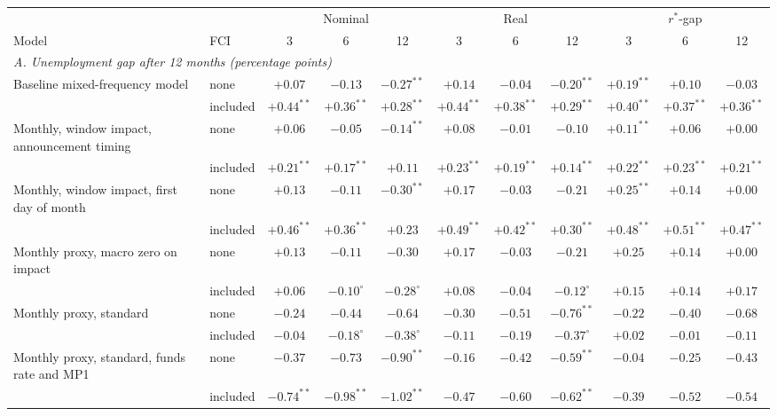 \begin{tabular}{llccccccccc}\toprule
 & & \multicolumn{3}{c}{Nominal} & \multicolumn{3}{c}{Real} & \multicolumn{3}{c}{$r^*$-gap}\\
\cmidrule(lr){3-5}\cmidrule(lr){6-8}\cmidrule(lr){9-11}
Model & FCI & 3 & 6 & 12 & 3 & 6 & 12 & 3 & 6 & 12\\
\midrule
\multicolumn{11}{l}{\textit{A. Unemployment gap after 12 months (percentage points)}}\\
Baseline mixed-frequency model & none & $+0.07$ & $-0.13$ & $-0.27^{**}$ & $+0.14$ & $-0.04$ & $-0.20^{**}$ & $+0.19^{**}$ & $+0.10$ & $-0.03$\\
 & included & $+0.44^{**}$ & $+0.36^{**}$ & $+0.28^{**}$ & $+0.44^{**}$ & $+0.38^{**}$ & $+0.29^{**}$ & $+0.40^{**}$ & $+0.37^{**}$ & $+0.36^{**}$\\
Monthly, window impact, announcement timing & none & $+0.06$ & $-0.05$ & $-0.14^{**}$ & $+0.08$ & $-0.01$ & $-0.10$ & $+0.11^{**}$ & $+0.06$ & $+0.00$\\
 & included & $+0.21^{**}$ & $+0.17^{**}$ & $+0.11$ & $+0.23^{**}$ & $+0.19^{**}$ & $+0.14^{**}$ & $+0.22^{**}$ & $+0.23^{**}$ & $+0.21^{**}$\\
Monthly, window impact, first day of month & none & $+0.13$ & $-0.11$ & $-0.30^{**}$ & $+0.17$ & $-0.03$ & $-0.21$ & $+0.25^{**}$ & $+0.14$ & $+0.00$\\
 & included & $+0.46^{**}$ & $+0.36^{**}$ & $+0.23$ & $+0.49^{**}$ & $+0.42^{**}$ & $+0.30^{**}$ & $+0.48^{**}$ & $+0.51^{**}$ & $+0.47^{**}$\\
Monthly proxy, macro zero on impact & none & $+0.13$ & $-0.11$ & $-0.30$ & $+0.17$ & $-0.03$ & $-0.21$ & $+0.25$ & $+0.14$ & $+0.00$\\
 & included & $+0.06$ & $-0.10^{\circ}$ & $-0.28^{\circ}$ & $+0.08$ & $-0.04$ & $-0.12^{\circ}$ & $+0.15$ & $+0.14$ & $+0.17$\\
Monthly proxy, standard & none & $-0.24$ & $-0.44$ & $-0.64$ & $-0.30$ & $-0.51$ & $-0.76^{**}$ & $-0.22$ & $-0.40$ & $-0.68$\\
 & included & $-0.04$ & $-0.18^{\circ}$ & $-0.38^{\circ}$ & $-0.11$ & $-0.19$ & $-0.37^{\circ}$ & $+0.02$ & $-0.01$ & $-0.11$\\
Monthly proxy, standard, funds rate and MP1 & none & $-0.37$ & $-0.73$ & $-0.90^{**}$ & $-0.16$ & $-0.42$ & $-0.59^{**}$ & $-0.04$ & $-0.25$ & $-0.43$\\
 & included & $-0.74^{**}$ & $-0.98^{**}$ & $-1.02^{**}$ & $-0.47$ & $-0.60$ & $-0.62^{**}$ & $-0.39$ & $-0.52$ & $-0.54$\\

\end{tabular}
